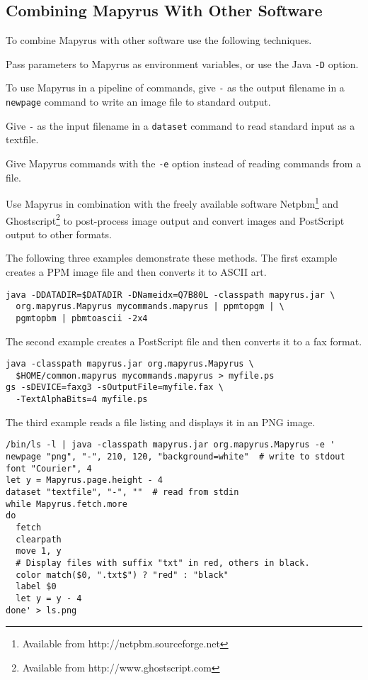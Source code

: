\subsection{Combining Mapyrus With Other Software}

To combine Mapyrus with other software use the following
techniques.

Pass parameters to Mapyrus
as environment variables, or use the Java
\texttt{-D} option.

To use Mapyrus in a pipeline of commands,
give \texttt{-} as the output filename in a
\texttt{newpage}
command to write an image file to standard output.

Give \texttt{-} as the input filename in a
\texttt{dataset}
command to read standard input as a textfile.

Give Mapyrus commands with the \texttt{-e} option
instead of reading commands from a file.

Use Mapyrus in combination with the freely available software
Netpbm\footnote{Available from http://netpbm.sourceforge.net} and
Ghostscript\footnote{Available from http://www.ghostscript.com} to post-process
image output and convert images and PostScript output to other formats.

The following three examples demonstrate these methods.
The first example creates a PPM image file and then converts it to ASCII art.

\begin{verbatim}
java -DDATADIR=$DATADIR -DNameidx=Q7B80L -classpath mapyrus.jar \
  org.mapyrus.Mapyrus mycommands.mapyrus | ppmtopgm | \
  pgmtopbm | pbmtoascii -2x4
\end{verbatim}

The second example creates a PostScript file and then converts it
to a fax format.

\begin{verbatim}
java -classpath mapyrus.jar org.mapyrus.Mapyrus \
  $HOME/common.mapyrus mycommands.mapyrus > myfile.ps
gs -sDEVICE=faxg3 -sOutputFile=myfile.fax \
  -TextAlphaBits=4 myfile.ps
\end{verbatim}

The third example reads a file listing and displays it in an
PNG image.

\begin{verbatim}
/bin/ls -l | java -classpath mapyrus.jar org.mapyrus.Mapyrus -e '
newpage "png", "-", 210, 120, "background=white"  # write to stdout
font "Courier", 4
let y = Mapyrus.page.height - 4
dataset "textfile", "-", ""  # read from stdin
while Mapyrus.fetch.more
do
  fetch 
  clearpath
  move 1, y
  # Display files with suffix "txt" in red, others in black.
  color match($0, ".txt$") ? "red" : "black"
  label $0
  let y = y - 4
done' > ls.png
\end{verbatim}

